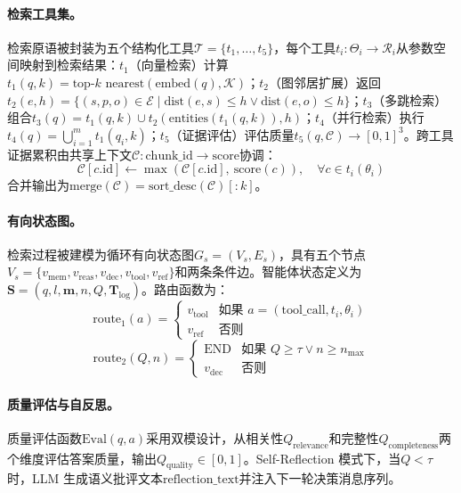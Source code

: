 \documentclass[runningheads]{llncs}
\begin{document}
\paragraph{检索工具集。}
检索原语被封装为五个结构化工具$\mathcal{T} = \{t_1, \ldots, t_5\}$，每个工具$t_i: \Theta_i \to \mathcal{R}_i$从参数空间映射到检索结果：$t_1$（向量检索）计算$t_1(q, k) = \text{top-}k\text{ nearest}(\text{embed}(q), \mathcal{K})$；$t_2$（图邻居扩展）返回$t_2(e, h) = \{(s, p, o) \in \mathcal{E} \mid \text{dist}(e, s) \leq h \vee \text{dist}(e, o) \leq h\}$；$t_3$（多跳检索）组合$t_3(q) = t_1(q, k) \cup t_2(\text{entities}(t_1(q, k)), h)$；$t_4$（并行检索）执行$t_4(q) = \bigcup_{i=1}^{m} t_1(q_i, k)$；$t_5$（证据评估）评估质量$t_5(q, \mathcal{C}) \to [0,1]^3$。跨工具证据累积由共享上下文$\mathcal{C}: \text{chunk\_id} \to \text{score}$协调：
\begin{equation}
    \mathcal{C}[c.\text{id}] \leftarrow \max(\mathcal{C}[c.\text{id}],\ \text{score}(c)), \quad \forall c \in t_i(\theta_i)
\end{equation}
合并输出为$\text{merge}(\mathcal{C}) = \text{sort\_desc}(\mathcal{C})[:k]$。

\paragraph{有向状态图。}
检索过程被建模为循环有向状态图$G_s = (V_s, E_s)$，具有五个节点$V_s = \{v_{\text{mem}}, v_{\text{reas}}, v_{\text{dec}}, v_{\text{tool}}, v_{\text{ref}}\}$和两条条件边。智能体状态定义为$\mathbf{S} = (q, l, \mathbf{m}, n, Q, \mathbf{T}_{\log})$。路由函数为：
\begin{equation}
    \text{route}_1(a) = \begin{cases}
    v_{\text{tool}} & \text{如果 } a = (\text{tool\_call}, t_i, \theta_i) \\
    v_{\text{ref}} & \text{否则}
    \end{cases}
\end{equation}
\begin{equation}
    \text{route}_2(Q, n) = \begin{cases}
    \text{END} & \text{如果 } Q \geq \tau \vee n \geq n_{\max} \\
    v_{\text{dec}} & \text{否则}
    \end{cases}
\end{equation}

\paragraph{质量评估与自反思。}
质量评估函数$\text{Eval}(q, a)$采用双模设计，从相关性$Q_{\text{relevance}}$和完整性$Q_{\text{completeness}}$两个维度评估答案质量，输出$Q_{\text{quality}} \in [0,1]$。Self-Reflection 模式下，当$Q < \tau$时，LLM 生成语义批评文本$\text{reflection\_text}$并注入下一轮决策消息序列。
\end{document}
